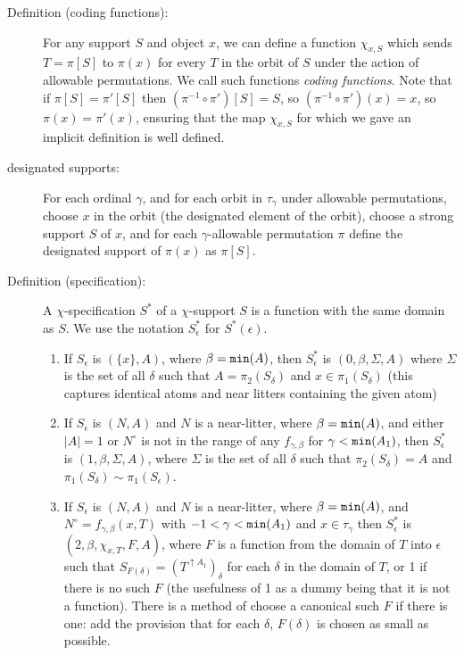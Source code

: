 \documentclass[112pt]{article}
\begin{document}
\begin{description}
\item[Definition (coding functions):]  For any support $S$ and object $x$, we can define a function $\chi_{x,S}$ which sends $T=\pi[S]$ to $\pi(x)$ for every $T$ in the orbit of $S$ under
the action of allowable permutations.  We call such functions {\em coding functions\/}.  Note that if $\pi[S]=\pi'[S]$ then $(\pi^{-1}\circ \pi')[S]= S$, so 
$(\pi^{-1}\circ \pi')(x)= x$, so $\pi(x)=\pi'(x)$, ensuring that the map $\chi_{x,S}$ for which we gave an implicit definition is well defined.

\item[designated supports:]  For each ordinal $\gamma$, and for each orbit in $\tau_\gamma$ under allowable permutations, choose $x$ in the orbit (the designated element of the orbit), choose a strong support $S$ of $x$, and for each $\gamma$-allowable permutation
$\pi$ define the designated support of $\pi(x)$ as $\pi[S]$.  

\item[Definition (specification):]  A $\chi$-specification $S^*$ of a $\chi$-support $S$ is a function with the same domain as $S$.  We use the notation $S^*_\epsilon$ for $S^*(\epsilon)$.

\begin{enumerate}

\item  If $S_{\epsilon}$ is $(\{x\},A)$, where $\beta={\tt min}(A)$, then $S^*_\epsilon$ is $(0,\beta,\Sigma,A)$ where  $\Sigma$ is the set of all $\delta$ such that $A=\pi_2(S_\delta)$ and $x \in  \pi_1(S_\delta)$ (this captures identical atoms and near litters containing the given atom)

\item  If $S_\epsilon$ is $(N,A)$ and $N$ is a near-litter, where $\beta={\tt min}(A)$, and either $|A|=1$ or $N^\circ$ is not in the range of any $f_{\gamma,\beta}$ for $\gamma<{\tt min}(A_1)$, then $S^*_\epsilon$ is $(1,\beta,\Sigma,A)$, where $\Sigma$ is the set of all $\delta$ such that $\pi_2(S_\delta) = A$
and $\pi_1(S_\delta) \sim \pi_1(S_\epsilon)$.

\item  If $S_\epsilon$ is $(N,A)$ and $N$ is a near-litter, where $\beta={\tt min}(A)$, and $N^\circ=f_{\gamma,\beta}(x,T)$ with $-1<\gamma<{\tt min}(A_1)$ and $x\in \tau_\gamma$ then 
$S^*_\epsilon$ is $(2,\beta,\chi_{x,T},F,A)$, where $F$ is a function from the domain of $T$ into $\epsilon$
such that $S_{F(\delta)} = (T^{\uparrow A_1})_\delta$ for each $\delta$ in the domain of $T$, or 1 if there is no such $F$ (the usefulness of 1 as a dummy being that it is not a function).  There is a method of choose a canonical such $F$ if there is one:  add the provision that for each $\delta$, $F(\delta)$ is chosen as small as possible.


\end{enumerate}
\end{description}
\end{document}
